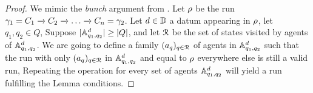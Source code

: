 \begin{proof}
%	
%	
%	
%	
%	
We mimic the \emph{bunch} argument from \cite{EsparzaRW2019}. 
Let $\rho$ be the run $\gamma_1=C_1 \xrightarrow{} C_2 \xrightarrow{} \ldots \xrightarrow{} C_n = \gamma_2$.
Let $d\in \mathbb{D}$ a datum appearing in $\rho$,  let $q_1, q_2 \in Q$, 
Suppose $|\mathbb{A}^d_{q_1, q_2}| \geq |Q|$, and 
let $\mathcal{R}$ be the set of states visited by agents of $\mathbb{A}^d_{q_1, q_2}$.
We are going to define a family $(a_q)_{q \in \mathcal{R}}$ of agents in $\mathbb{A}^d_{q_1, q_2}$ 
such that the run with only  $(a_q)_{q \in \mathcal{R}}$ in $\mathbb{A}^d_{q_1, q_2}$ 
and equal to $\rho$ everywhere else is still a valid run,
Repeating the operation for every set of agents $\mathbb{A}^d_{q_1, q_2}$
will yield a run fulfilling the Lemma conditions.


\end{proof}

